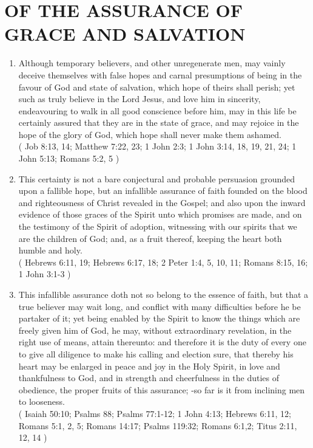 \documentclass[12pt,a4paper]{book}
\begin{document}
\chapter{OF THE ASSURANCE OF GRACE AND SALVATION}
\label{ch-ass-gra-sal}
\begin{enumerate}
\item Although temporary believers, and other unregenerate men, may vainly deceive themselves with false hopes and carnal presumptions of being in the favour of God and state of salvation, which hope of theirs shall perish; yet such as truly believe in the Lord Jesus, and love him in sincerity, endeavouring to walk in all good conscience before him, may in this life be certainly assured that they are in the state of grace, and may rejoice in the hope of the glory of God, which hope shall never make them ashamed.\\
( Job 8:13, 14; Matthew 7:22, 23; 1 John 2:3; 1 John 3:14, 18, 19, 21, 24; 1 John 5:13; Romans 5:2, 5 )
\item This certainty is not a bare conjectural and probable persuasion grounded upon a fallible hope, but an infallible assurance of faith founded on the blood and righteousness of Christ revealed in the Gospel; and also upon the inward evidence of those graces of the Spirit unto which promises are made, and on the testimony of the Spirit of adoption, witnessing with our spirits that we are the children of God; and, as a fruit thereof, keeping the heart both humble and holy.\\
( Hebrews 6:11, 19; Hebrews 6:17, 18; 2 Peter 1:4, 5, 10, 11; Romans 8:15, 16; 1 John 3:1-3 )
\item This infallible assurance doth not so belong to the essence of faith, but that a true believer may wait long, and conflict with many difficulties before he be partaker of it; yet being enabled by the Spirit to know the things which are freely given him of God, he may, without extraordinary revelation, in the right use of means, attain thereunto: and therefore it is the duty of every one to give all diligence to make his calling and election sure, that thereby his heart may be enlarged in peace and joy in the Holy Spirit, in love and thankfulness to God, and in strength and cheerfulness in the duties of obedience, the proper fruits of this assurance; -so far is it from inclining men to looseness.\\
( Isaiah 50:10; Psalms 88; Psalms 77:1-12; 1 John 4:13; Hebrews 6:11, 12; Romans 5:1, 2, 5; Romans 14:17; Psalms 119:32; Romans 6:1,2; Titus 2:11, 12, 14 )

\end{enumerate}
\end{document}
